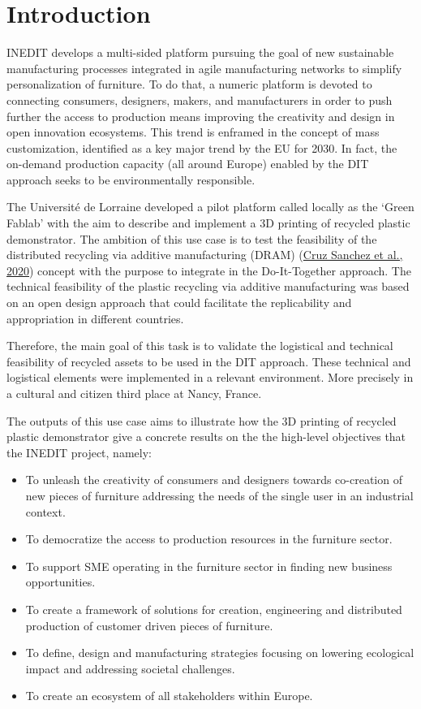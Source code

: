 \documentclass[
  11pt,
]{article}
\providecommand{\tightlist}{%
  \setlength{\itemsep}{0pt}\setlength{\parskip}{0pt}}\usepackage{longtable,booktabs,array}
\begin{document}
\newpage

\hypertarget{introduction}{%
\section{Introduction}\label{introduction}}

INEDIT develops a multi-sided platform pursuing the goal of new
sustainable manufacturing processes integrated in agile manufacturing
networks to simplify personalization of furniture. To do that, a numeric
platform is devoted to connecting consumers, designers, makers, and
manufacturers in order to push further the access to production means
improving the creativity and design in open innovation ecosystems. This
trend is enframed in the concept of mass customization, identified as a
key major trend by the EU for 2030. In fact, the on-demand production
capacity (all around Europe) enabled by the DIT approach seeks to be
environmentally responsible.

The Université de Lorraine developed a pilot platform called locally as
the `Green Fablab' with the aim to describe and implement a 3D printing
of recycled plastic demonstrator. The ambition of this use case is to
test the feasibility of the distributed recycling via additive
manufacturing (DRAM) (\protect\hyperlink{ref-CruzSanchez2020}{Cruz
Sanchez et al., 2020}) concept with the purpose to integrate in the
Do-It-Together approach. The technical feasibility of the plastic
recycling via additive manufacturing was based on an open design
approach that could facilitate the replicability and appropriation in
different countries.

Therefore, the main goal of this task is to validate the logistical and
technical feasibility of recycled assets to be used in the DIT approach.
These technical and logistical elements were implemented in a relevant
environment. More precisely in a cultural and citizen third place at
Nancy, France.

The outputs of this use case aims to illustrate how the 3D printing of
recycled plastic demonstrator give a concrete results on the the
high-level objectives that the INEDIT project, namely:

\begin{itemize}
\tightlist
\item
  To unleash the creativity of consumers and designers towards
  co-creation of new pieces of furniture addressing the needs of the
  single user in an industrial context.
\item
  To democratize the access to production resources in the furniture
  sector.
\item
  To support SME operating in the furniture sector in finding new
  business opportunities.
\item
  To create a framework of solutions for creation, engineering and
  distributed production of customer driven pieces of furniture.
\item
  To define, design and manufacturing strategies focusing on lowering
  ecological impact and addressing societal challenges.
\item
  To create an ecosystem of all stakeholders within Europe.
\end{itemize}
\end{document}
